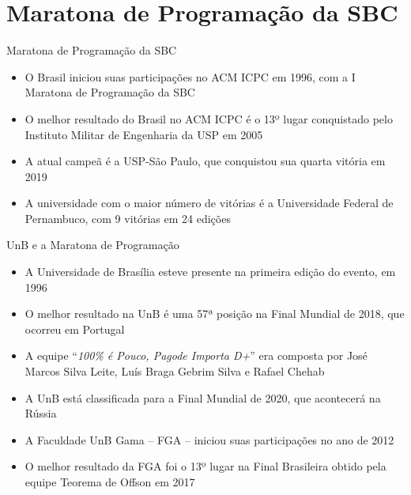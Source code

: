 \section{Maratona de Programação da SBC}

\begin{frame}[fragile]{Maratona de Programação da SBC}

    \begin{itemize}
        \item O Brasil iniciou suas participações no ACM ICPC em 1996, com a I Maratona de
            Programação da SBC
        \item O melhor resultado do Brasil no ACM ICPC é o 13º lugar conquistado pelo 
            Instituto Militar de Engenharia da USP em 2005
        \item A atual campeã é a USP-São Paulo, que conquistou sua quarta vitória em 2019
        \item A universidade com o maior número de vitórias é a Universidade Federal de
            Pernambuco, com 9 vitórias em 24 edições
    \end{itemize}

\end{frame}

\begin{frame}[fragile]{UnB e a Maratona de Programação}

    \begin{itemize}
        \item A Universidade de Brasília esteve presente na primeira edição do evento, em 1996
        \item O melhor resultado na UnB é uma 57ª posição na Final Mundial de 2018, que ocorreu
            em Portugal

        \item A equipe ``\textit{100\% é Pouco, Pagode Importa D+}'' era composta por José Marcos 
            Silva Leite, Luís Braga Gebrim Silva e Rafael Chehab 

        \item A UnB está classificada para a Final Mundial de 2020, que acontecerá na Rússia
        \item A Faculdade UnB Gama -- FGA -- iniciou suas participações no ano de 2012
        \item O melhor resultado da FGA foi o 13º lugar na Final Brasileira obtido pela equipe 
            Teorema de Offson em 2017
    \end{itemize}

\end{frame}
